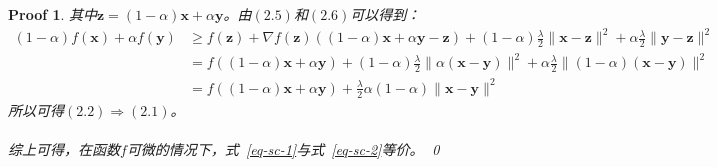 \documentclass[a4paper,UTF8]{article}
\numberwithin{equation}{section}
\newtheorem*{myProof}{Proof}
\begin{document}
\begin{myProof}
其中$\mathbf{z} = (1-\alpha)\mathbf{x} + \alpha\mathbf{y}$。由$(2.5)$和$(2.6)$可以得到：
\begin{equation}
\begin{aligned}
(1-\alpha) f(\mathbf{x}) + \alpha f(\mathbf{y}) &\geq f(\mathbf{z}) + \nabla f(\mathbf{z})((1-\alpha) \mathbf{x} + \alpha \mathbf{y} - \mathbf{z}) + (1-\alpha)\frac{\lambda}{2}\lVert \mathbf{x} - \mathbf{z}\rVert^2 + \alpha\frac{\lambda}{2}\lVert \mathbf{y} - \mathbf{z}\rVert^2\\
& =f((1-\alpha)\mathbf{x}+\alpha\mathbf{y}) + (1-\alpha)\frac{\lambda}{2}\lVert \alpha(\mathbf{x} - \mathbf{y})\rVert^2 + \alpha\frac{\lambda}{2}\lVert (1-\alpha)(\mathbf{x} - \mathbf{y})\rVert^2\\
& = f((1-\alpha)\mathbf{x}+\alpha\mathbf{y}) + \frac{\lambda}{2}\alpha(1-\alpha)\lVert \mathbf{x} - \mathbf{y}\rVert^2
\end{aligned}
\end{equation}
所以可得$(2.2) \Rightarrow (2.1)$。\\\\
综上可得，在函数$f$可微的情况下，式~\eqref{eq-sc-1}与式~\eqref{eq-sc-2}等价。
\qed
\end{myProof}


\newpage
\end{document}
